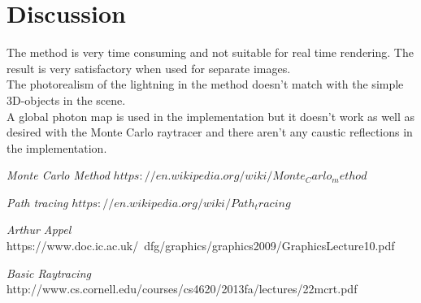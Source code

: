 \documentclass[a4paper,12pt,oneside,final]{report}
\begin{document}
\section{Discussion}
The method is very time consuming and not suitable for real time rendering. The result is very satisfactory when used for separate images. \\
The photorealism of the lightning in the method doesn't match with the simple 3D-objects in the scene.
\\
A global photon map is used in the implementation but it doesn't work as well as desired with the Monte Carlo raytracer and there aren't any caustic reflections in the implementation.
\begin{thebibliography}{00}
\emph{Monte Carlo Method}\newline
$https://en.wikipedia.org/wiki/Monte_Carlo_method$

\emph{Path tracing}\newline
$https://en.wikipedia.org/wiki/Path_tracing$

\emph{Arthur Appel}\newline
https://www.doc.ic.ac.uk/~dfg/graphics/graphics2009/GraphicsLecture10.pdf

\emph{Basic Raytracing}\newline
http://www.cs.cornell.edu/courses/cs4620/2013fa/lectures/22mcrt.pdf



\end{thebibliography}
\end{document}
